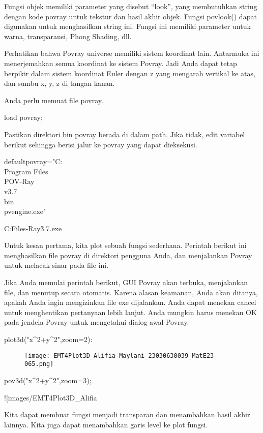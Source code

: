 \documentclass{article}
\begin{document}
Fungsi objek memiliki parameter yang disebut “look”, yang membutuhkan
string dengan kode povray untuk tekstur dan hasil akhir objek. Fungsi
povlook() dapat digunakan untuk menghasilkan string ini. Fungsi ini
memiliki parameter untuk warna, transparansi, Phong Shading, dll.


Perhatikan bahwa Povray universe memiliki sistem koordinat lain.
Antarmuka ini menerjemahkan semua koordinat ke sistem Povray. Jadi
Anda dapat tetap berpikir dalam sistem koordinat Euler dengan z yang
mengarah vertikal ke atas, dan sumbu x, y, z di tangan kanan.


Anda perlu memuat file povray.


\>load povray;


Pastikan direktori bin povray berada di dalam path. Jika tidak, edit
variabel berikut sehingga berisi jalur ke povray yang dapat
dieksekusi.


\>defaultpovray="C:\\Program Files\\POV-Ray\\v3.7\\bin\\pvengine.exe"


    C:\Program Files\POV-Ray\v3.7\bin\pvengine.exe

Untuk kesan pertama, kita plot sebuah fungsi sederhana. Perintah
berikut ini menghasilkan file povray di direktori pengguna Anda, dan
menjalankan Povray untuk melacak sinar pada file ini.


Jika Anda memulai perintah berikut, GUI Povray akan terbuka,
menjalankan file, dan menutup secara otomatis. Karena alasan keamanan,
Anda akan ditanya, apakah Anda ingin mengizinkan file exe dijalankan.
Anda dapat menekan cancel untuk menghentikan pertanyaan lebih lanjut.
Anda mungkin harus menekan OK pada jendela Povray untuk mengetahui
dialog awal Povray.


\>plot3d("x^2+y^2",zoom=2):


\begin{figure}
    \centering
    \texttt{[image: EMT4Plot3D\_Alifia Maylani\_23030630039\_MatE23-065.png]}
    \caption{}
    \label{fig:enter-label}
\end{figure}

\>pov3d("x^2+y^2",zoom=3);


![images/EMT4Plot3D_Alifia%

Kita dapat membuat fungsi menjadi transparan dan menambahkan hasil
akhir lainnya. Kita juga dapat menambahkan garis level ke plot fungsi.
\end{document}
